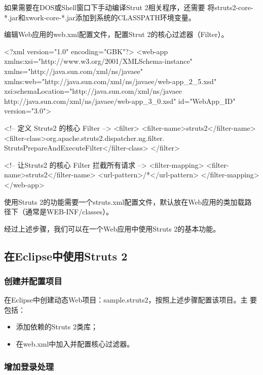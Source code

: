 如果需要在DOS或Shell窗口下手动编译Strut 2相关程序，还需要
将struts2-core-*.jar和xwork-core-*.jar添加到系统的CLASSPATH环境变量。


编辑Web应用的web.xml配置文件，配置Strut 2的核心过滤器（Filter）。

\begin{xmlCode}\footnotesize
  <?xml version="1.0" encoding="GBK"?>
  <web-app xmlns:xsi="http://www.w3.org/2001/XMLSchema-instance" 
  xmlns="http://java.sun.com/xml/ns/javaee" 
  xmlns:web="http://java.sun.com/xml/ns/javaee/web-app_2_5.xsd" 
  xsi:schemaLocation="http://java.sun.com/xml/ns/javaee 
  http://java.sun.com/xml/ns/javaee/web-app_3_0.xsd" 
  id="WebApp_ID" version="3.0">

  <!-- 定义 Struts2 的核心 Filter -->
  <filter>
  <filter-name>struts2</filter-name>
  <filter-class>org.apache.struts2.dispatcher.ng.filter.
  StrutsPrepareAndExecuteFilter</filter-class>
  </filter>
  
  <!-- 让Struts2 的核心 Filter 拦截所有请求 -->
  <filter-mapping>
  <filter-name>struts2</filter-name>
  <url-pattern>/*</url-pattern>
  </filter-mapping>
  </web-app>   
\end{xmlCode}

使用Struts 2的功能需要一个struts.xml配置文件，默认放在Web应用的类加载路
径下（通常是WEB-INF/classes）。

经过上述步骤，我们可以在一个Web应用中使用Struts 2的基本功能。

\subsection{在Eclipse中使用Struts 2}

\subsubsection{创建并配置项目}

在Eclipse中创建动态Web项目：sample.struts2，按照上述步骤配置该项目。主
要包括：

\begin{itemize}
\item 添加依赖的Struts 2类库；
\item 在web.xml中加入并配置核心过滤器。
\end{itemize}

\subsubsection{增加登录处理}

